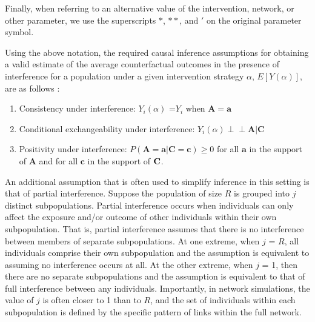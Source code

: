 \documentclass{article}
\theoremstyle{definition}
\newcommand{\indep}{\perp \!\!\! \perp}
\begin{document}
Finally, when referring to an alternative value of the intervention, network, or other parameter, we use the superscripts $*$, $**$, and $'$ on the original parameter symbol.

Using the above notation, the required causal inference assumptions for obtaining a valid estimate of the average counterfactual outcomes in the presence of interference for a population under a given intervention strategy $\alpha$, $E[Y(\alpha)]$, are as follows \cite{halloran_study_1991, hudgens_toward_2008, ogburn_causal_2014, tchetgen_tchetgen_causal_2012}:


\begin{enumerate}
\item Consistency under interference: $Y_{i}(\alpha)$ =$Y_{i}$ when $\mathbf{A} =\mathbf{a}$
\item 	Conditional exchangeability under interference: $Y_{i}(\alpha) \indep \mathbf{A} |\mathbf{C}$
\item Positivity under interference: $P({\mathbf A}= {\mathbf a} |{\mathbf C} = {\mathbf c}) \ge 0$ for all ${\mathbf a}$ in the support of ${\mathbf A}$ and for all ${\mathbf c}$ in the support of ${\bf C}$.
\end{enumerate}

An additional assumption that is often used to simplify inference in this setting is that of partial interference. Suppose the population of size $R$ is grouped into $j$ distinct subpopulations. Partial interference occurs when individuals can only affect the exposure and/or outcome of other individuals within their own subpopulation. That is, partial interference assumes that there is no interference between members of separate subpopulations. At one extreme, when $j$ = $R$, all individuals comprise their own subpopulation and the assumption is equivalent to assuming no interference occurs at all. At the other extreme, when $j$ = 1, then there are no separate subpopulations and the assumption is equivalent to that of full interference between any individuals. Importantly, in network simulations, the value of $j$ is often closer to 1 than to $R$, and the set of individuals within each subpopulation is defined by the specific pattern of links within the full network.
\end{document}
